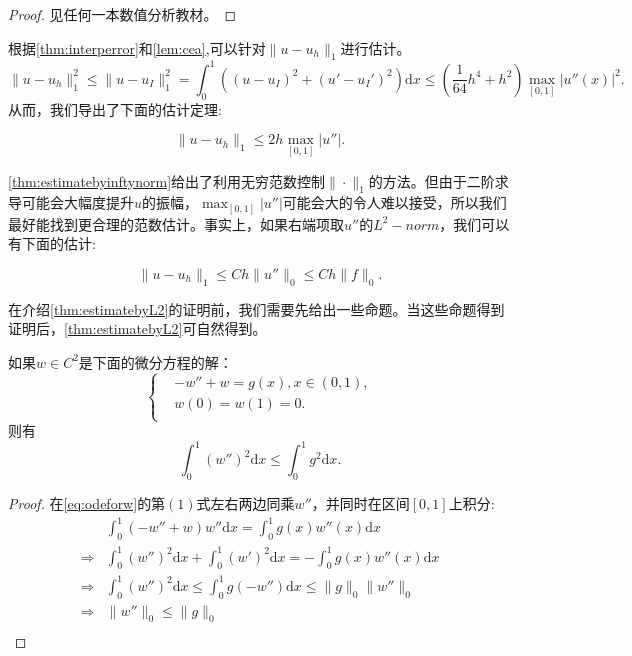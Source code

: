 \documentclass[lang=cn,10pt,newtx]{elegantbook}
\newcommand{\dif}{\mathrm{d}}
\newcommand{\norm}[1]{\|#1\|}
\begin{document}
\begin{proof}
  见任何一本数值分析教材。
\end{proof}
根据\ref{thm:interperror}和\ref{lem:cea},可以针对$\norm{u-u_{h}}_{1}$进行估计。
\begin{equation}
  \label{eq:ceaestimate}
  \norm{u-u_{h}}_{1}^{2}\le\norm{u-u_{I}}_{1}^{2}=\int_{0}^{1}((u-u_{I})^{2}+(u'-u_{I}')^{2})\dif x\le(\frac{1}{64}h^{4}+h^{2})\max_{[0,1]}|u''(x)|^{2}.
\end{equation}
从而，我们导出了下面的估计定理:
\begin{theorem}
  \label{thm:estimatebyinftynorm}
  \begin{equation}
    \norm{u-u_{h}}_{1}\le 2h\max_{[0,1]}|u''|.
  \end{equation}
\end{theorem}
\ref{thm:estimatebyinftynorm}给出了利用无穷范数控制$\norm{\cdot}_{1}$的方法。但由于二阶求导可能会大幅度提升$u$的振幅，$\max_{[0,1]}|u''|$可能会大的令人难以接受，所以我们最好能找到更合理的范数估计。事实上，如果右端项取$u''$的$L^{2}-norm$，我们可以有下面的估计:
\begin{theorem}
  \label{thm:estimatebyL2}
  \begin{equation}
    \norm{u-u_{h}}_{1}\le Ch\norm{u''}_{0}\le Ch\norm{f}_{0}.
  \end{equation}
\end{theorem}
在介绍\ref{thm:estimatebyL2}的证明前，我们需要先给出一些命题。当这些命题得到证明后，\ref{thm:estimatebyL2}可自然得到。
\begin{proposition}
  如果$w\in C^{2}$是下面的微分方程的解：
  \begin{equation}
    \label{eq:odeforw}
    \left\{
      \begin{aligned}
        &-w''+w=g(x),x\in(0,1),\\
        &w(0)=w(1)=0.\\
      \end{aligned}
    \right.
  \end{equation}
  则有
  \begin{equation}
    \label{eq:enermy-norm}
  \int_{0}^{1}(w'')^{2}\dif x\le\int_{0}^{1}g^{2}\dif x.
  \end{equation}
\end{proposition}
\begin{proof}
  在\eqref{eq:odeforw}的第$(1)$式左右两边同乘$w''$，并同时在区间$[0,1]$上积分: 
  \begin{equation}
    \begin{aligned}
      &\int_{0}^{1}(-w''+w)w''\dif x=\int_{0}^{1}g(x)w''(x)\dif x\\
      \Rightarrow&\int_{0}^{1}(w'')^{2}\dif x+\int_{0}^{1}(w')^{2}\dif x=-\int_{0}^{1}g(x)w''(x)\dif x\\
      \Rightarrow&\int_{0}^{1}(w'')^{2}\dif x\le\int_{0}^{1}g(-w'')\dif x\le \norm{g}_{0}\norm{w''}_{0}\\
      \Rightarrow&\norm{w''}_{0}\le\norm{g}_{0}\\
    \end{aligned}
  \end{equation}
\end{proof}
\end{document}
